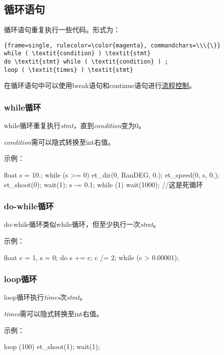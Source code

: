 \documentclass{article}
\begin{document}
\subsection{循环语句}

循环语句重复执行一些代码。形式为：

\begin{Verbatim}{frame=single, rulecolor=\color{magenta}, commandchars=\\\{\}}
while ( \textit{condition} ) \textit{stmt}
do \textit{stmt} while ( \textit{condition} ) ;
loop ( \textit{times} ) \textit{stmt}
\end{Verbatim}

在循环语句中可以使用break语句和continue语句进行\hyperref[break]{流程控制}。

\subsubsection{while循环}

while循环重复执行\textit{stmt}，直到\textit{condition}变为0。

\textit{condition}需可以隐式转换至int右值。

示例：

\begin{MUAvbt}
float s = 10.;
while (s >= 0) {
	et_dir(0, RanDEG, 0.);
	et_speed(0, s, 0.);
	et_shoot(0);
	wait(1);
	s -= 0.1;
}
while (1)
	wait(1000);			//这是死循环
\end{MUAvbt}

\subsubsection{do-while循环}

do-while循环类似while循环，但至少执行一次\textit{stmt}。

示例：

\begin{MUAvbt}
float c = 1, s = 0;
do {
	s += c;
	c /= 2;
} while (c > 0.00001);
\end{MUAvbt}

\subsubsection{loop循环}

loop循环执行\textit{times}次\textit{stmt}。

\textit{times}需可以隐式转换至int右值。

示例：

\begin{MUAvbt}
loop (100) {
	et_shoot(1);
	wait(1);
}
\end{MUAvbt}
\end{document}
